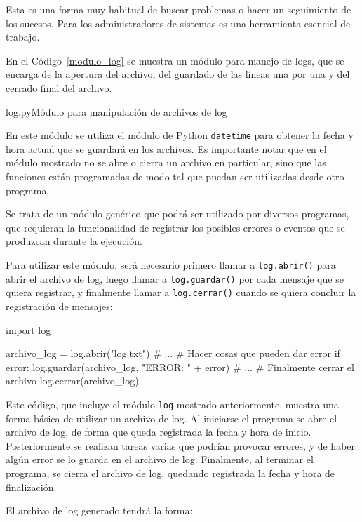 Esta es una forma muy habitual de buscar problemas o hacer un seguimiento
de los sucesos. Para los administradores de sistemas es una herramienta
esencial de trabajo.

En el Código~\ref{modulo_log} se muestra un módulo para manejo de logs, que
se encarga de la apertura del archivo, del guardado de las líneas una por
una y del cerrado final del archivo.

\begin{codigo}{log.py}{Módulo para manipulación de archivos de log}
\label{modulo_log}

\end{codigo}

En este módulo se utiliza el módulo de Python \lstinline!datetime! para
obtener la fecha y hora actual que se guardará en los archivos.  Es
importante notar que en el módulo mostrado no se abre o cierra un archivo
en particular, sino que las funciones están programadas de modo tal que
puedan ser utilizadas desde otro programa.

Se trata de un módulo genérico que podrá ser utilizado por diversos programas,
que requieran la funcionalidad de registrar los posibles errores o eventos que
se produzcan durante la ejecución.

Para utilizar este módulo, será necesario primero llamar a
\lstinline!log.abrir()! para abrir el archivo de log, luego llamar a
\lstinline!log.guardar()! por cada mensaje que se quiera registrar, y
finalmente llamar a \lstinline!log.cerrar()! cuando se quiera concluir la
registración de mensajes:

\begin{codigo-python-sn}
import log

archivo_log = log.abrir("log.txt")
# ...
# Hacer cosas que pueden dar error
if error:
    log.guardar(archivo_log, "ERROR: " + error)
# ...
# Finalmente cerrar el archivo
log.cerrar(archivo_log)
\end{codigo-python-sn}

Este código, que incluye el módulo \lstinline!log! mostrado anteriormente,
muestra una forma básica de utilizar un archivo de log.  Al iniciarse el
programa se abre el archivo de log, de forma que queda registrada la fecha
y hora de inicio.  Posteriormente se realizan tareas varias que podrían
provocar errores, y de haber algún error se lo guarda en el archivo de log.
Finalmente, al terminar el programa, se cierra el archivo de log, quedando
registrada la fecha y hora de finalización.

El archivo de log generado tendrá la forma:

